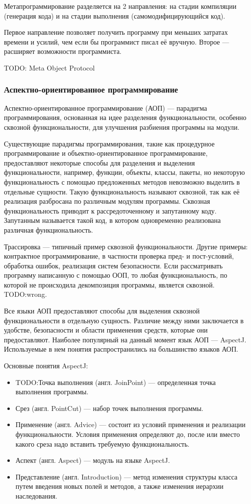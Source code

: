 \documentclass[a4paper,12pt]{article}
\begin{document}
Метапрограммирование разделяется на 2 направления: на стадии
компиляции (генерация кода) и на стадии выполнения (самомодифицирующийся код).

Первое направление позволяет получить программу при меньших затратах времени и
усилий, чем если бы программист писал её вручную. Второе — расширяет
возможности программиста.

TODO: Meta Object Protocol

\subsubsection*{Аспектно-ориентированное программирование}
\label{aop}
Аспектно-ориентированное программирование (АОП) — парадигма программирования,
основанная на идее разделения функциональности, особенно сквозной
функциональности, для улучшения разбиения программы на модули.

Существующие парадигмы программирования, такие как процедурное программирование
и объектно-ориентированное программирование, предоставляют некоторые способы
для разделения и выделения функциональности, например, функции, объекты,
классы, пакеты, но некоторую функциональность с помощью предложенных методов
невозможно выделить в отдельные сущности. Такую функциональность называют
сквозной, так как её реализация разбросана по различным модулям программы.
Сквозная функциональность приводит к рассредоточенному и запутанному коду.
Запутанным называется такой код, в котором одновременно реализована различная
функциональность.

Трассировка — типичный пример сквозной функциональности. Другие примеры:
контрактное программирование, в частности проверка пред- и пост-условий,
обработка ошибок, реализация систем безопасности. Если рассматривать программу
написанную с помощью ООП, то любая функциональность, по которой не происходила
декомпозиция программы, является сквозной. TODO:wrong.

Все языки АОП предоставляют способы для выделения сквозной функциональности в
отдельную сущность. Различие между ними заключается в удобстве, безопасности и
области применения средств, которые они предоставляют. Наиболее популярный на
данный момент язык АОП — AspectJ. Используемые в нем понятия распространились
на большинство языков АОП.

Основные понятия AspectJ:
\begin{itemize}
 \item TODO:Точка выполнения (англ. JoinPoint) — определенная точка выполнения
 программы.
 \item Срез (англ. PointCut) — набор точек выполнения программы.
 \item Применение (англ. Advice) — состоит из условий применения и реализации
 функциональности. Условия применения определяют до, после или вместо какого
 среза надо вставить требуемую функциональность.  
 \item Аспект (англ. Aspect) — модуль на языке AspectJ.
 \item Представление (англ. Introduction) — метод изменения структуры класса
 путем введения новых полей и методов, а также изменения иерархии наследования.
\end{itemize}
\end{document}
